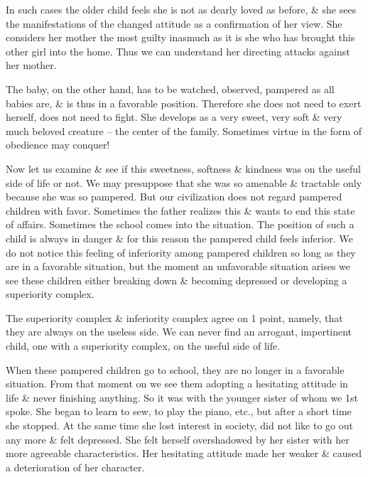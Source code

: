 \documentclass{article}
\numberwithin{equation}{section}
\begin{document}
In such cases the older child feels she is not as dearly loved as before, \& she sees the manifestations of the changed attitude as a confirmation of her view. She considers her mother the most guilty inasmuch as it is she who has brought this other girl into the home. Thus we can understand her directing attacks against her mother.

The baby, on the other hand, has to be watched, observed, pampered as all babies are, \& is thus in a favorable position. Therefore she does not need to exert herself, does not need to fight. She develops as a very sweet, very soft \& very much beloved creature -- the center of the family. Sometimes virtue in the form of obedience may conquer!

Now let us examine \& see if this sweetness, softness \& kindness was on the useful side of life or not. We may presuppose that she was so amenable \& tractable only because she was so pampered. But our civilization does not regard pampered children with favor. Sometimes the father realizes this \& wants to end this state of affairs. Sometimes the school comes into the situation. The position of such a child is always in danger \& for this reason the pampered child feels inferior. We do not notice this feeling of inferiority among pampered children so long as they are in a favorable situation, but the moment an unfavorable situation arises we see these children either breaking down \& becoming depressed or developing a superiority complex.

The superiority complex \& inferiority complex agree on 1 point, namely, that they are always on the useless side. We can never find an arrogant, impertinent child, one with a superiority complex, on the useful side of life.

When these pampered children go to school, they are no longer in a favorable situation. From that moment on we see them adopting a hesitating attitude in life \& never finishing anything. So it was with the younger sister of whom we 1st spoke. She began to learn to sew, to play the piano, etc., but after a short time she stopped. At the same time she lost interest in society, did not like to go out any more \& felt depressed. She felt herself overshadowed by her sister with her more agreeable characteristics. Her hesitating attitude made her weaker \& caused a deterioration of her character.
\end{document}
